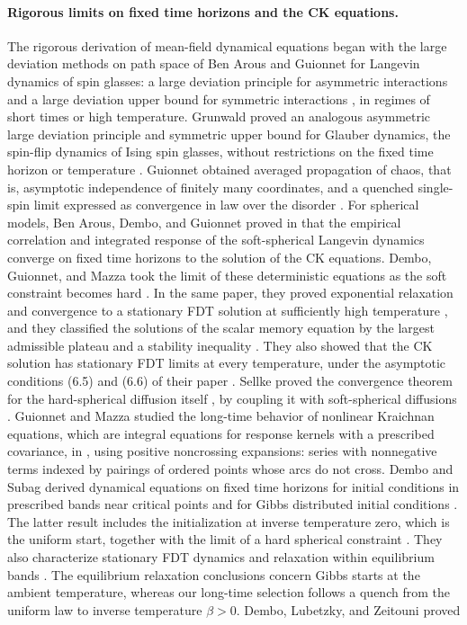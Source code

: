 \paragraph{Rigorous limits on fixed time horizons and the CK equations.}
The rigorous derivation of mean-field dynamical equations began with the large deviation methods on path space of Ben Arous and Guionnet for Langevin dynamics of spin glasses: a large deviation principle for asymmetric interactions \cite{bg1995} and a large deviation upper bound for symmetric interactions \cite{bg1997}, in regimes of short times or high temperature. Grunwald proved an analogous asymmetric large deviation principle and symmetric upper bound for Glauber dynamics, the spin-flip dynamics of Ising spin glasses, without restrictions on the fixed time horizon or temperature \cite{grunwald1996}. Guionnet obtained averaged propagation of chaos, that is, asymptotic independence of finitely many coordinates, and a quenched single-spin limit expressed as convergence in law over the disorder \cite{guionnet1997}. For spherical models, Ben Arous, Dembo, and Guionnet proved in \cite[Theorem~1.2]{bag2006} that the empirical correlation and integrated response of the soft-spherical Langevin dynamics converge on fixed time horizons to the solution of the CK equations. Dembo, Guionnet, and Mazza took the limit of these deterministic equations as the soft constraint becomes hard \cite[Proposition~1.1]{dgm2007}. In the same paper, they proved exponential relaxation and convergence to a stationary FDT solution at sufficiently high temperature \cite[Proposition~1.2 and Theorem~1.3]{dgm2007}, and they classified the solutions of the scalar memory equation by the largest admissible plateau and a stability inequality \cite[Proposition~1.4]{dgm2007}. They also showed that the CK solution has stationary FDT limits at every temperature, under the asymptotic conditions (6.5) and (6.6) of their paper \cite[Proposition~6.1]{dgm2007}. Sellke proved the convergence theorem for the hard-spherical diffusion itself \cite[Theorem~4.3]{sellke2024}, by coupling it with soft-spherical diffusions \cite[Lemmas~3.1 and~3.2]{sellke2024}. Guionnet and Mazza studied the long-time behavior of nonlinear Kraichnan equations, which are integral equations for response kernels with a prescribed covariance, in \cite{guionnetmazza2005}, using positive noncrossing expansions: series with nonnegative terms indexed by pairings of ordered points whose arcs do not cross. Dembo and Subag derived dynamical equations on fixed time horizons for initial conditions in prescribed bands near critical points \cite{ds2020} and for Gibbs distributed initial conditions \cite{ds2025}. The latter result includes the initialization at inverse temperature zero, which is the uniform start, together with the limit of a hard spherical constraint \cite[Theorem~1.8(a) and Proposition~1.10]{ds2025}. They also characterize stationary FDT dynamics and relaxation within equilibrium bands \cite[Proposition~1.14 and Corollary~1.18]{ds2025}. The equilibrium relaxation conclusions concern Gibbs starts at the ambient temperature, whereas our long-time selection follows a quench from the uniform law to inverse temperature $\beta>0$. Dembo, Lubetzky, and Zeitouni proved 